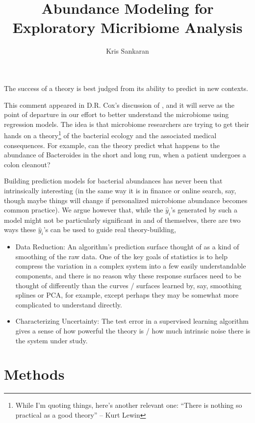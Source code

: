 \documentclass{article}
\title{Abundance Modeling for Exploratory Micribiome Analysis}
\author{Kris Sankaran}
\begin{document}
\maketitle

\begin{displayquote}
The success of a theory is best judged from its ability to predict
  in new contexts.
\end{displayquote}

This comment appeared in D.R. Cox's discussion of \cite{breiman2001statistical},
and it will serve as the point of departure in our effort to better understand
the microbiome using regression models. The idea is that microbiome
researchers are trying to get their hands on a theory\footnote{While I'm quoting
  things, here's another relevant one: ``There is nothing so practical as a good
  theory'' -- Kurt Lewin} of the bacterial ecology and the associated medical
consequences. For example, can the theory predict what happens to the abundance
of Bacteroides in the short and long run, when a patient undergoes a colon
cleanout?

Building prediction models for bacterial abundances has never been that
intrinsically interesting (in the same way it is in finance or online search,
say, though maybe things will change if personalized microbiome abundance
becomes common practice). We argue however that, while the $\hat{y}_{i}$'s
generated by such a model might not be particularly significant in and of
themselves, there are two ways these $\hat{y}_{i}$'s can be used to guide real
theory-building,

\begin{itemize}
\item Data Reduction: An algorithm's prediction surface thought of as a kind of
  smoothing of the raw data. One of the key goals of statistics is to help
  compress the variation in a complex system into a few easily understandable
  components, and there is no reason why these response surfaces need to be
  thought of differently than the curves / surfaces learned by, say, smoothing
  splines or PCA, for example, except perhaps they may be somewhat more
  complicated to understand directly.
\item Characterizing Uncertainty: The test error in a supervised learning
  algorithm gives a sense of how powerful the theory is / how much intrinsic
  noise there is the system under study.
\end{itemize}

\section{Methods}
\end{document}
